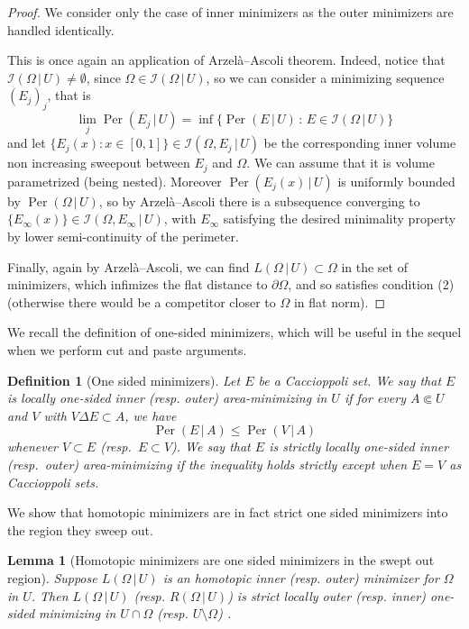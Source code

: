 \documentclass[12pt,twoside]{amsart}
\numberwithin{equation}{section}
\renewcommand{\leq}{\leqslant}
\newtheorem{lemma}[theorem]{Lemma}
\newtheorem{definition}[theorem]{Definition}
\newcommand{\cI}{\mathcal I}
\DeclareMathOperator{\Per}{Per}
\begin{document}
\begin{proof} We consider only the case of inner minimizers as the outer minimizers are handled identically. 

This is once again an application of Arzel\`a--Ascoli theorem. Indeed, notice that $\cI(\Omega\,|\, U) \not = \emptyset$, since $\Omega \in \cI(\Omega\,|\, U)$, so we can consider a minimizing sequence $(E_j)_j$, that is 
\[
	\lim_{j}\Per( E_j\,|\,U)=\inf\{ \Per(E\,|\,U)\,:\, E\in  \cI(\Omega\,|\, U)
	\}
\]
	and let $\{E_j(x): x\in [0,1]\} \in \cI(\Omega,E_j \,|\, U)$ be the corresponding inner volume non increasing sweepout between $E_j$ and $\Omega$. We can assume that it is volume parametrized (being nested). Moreover $\Per(E_j(x)\,|\,U)$ is uniformly bounded by $\Per(\Omega\,|\,U)$, so by Arzel\`a--Ascoli there is a subsequence converging to $\{E_\infty(x)\} \in \cI(\Omega, E_\infty\,|\, U)$, with $E_\infty$ satisfying the desired minimality property by lower semi-continuity of the perimeter. 
	
	Finally, again by Arzel\`a--Ascoli, we can find $L(\Omega\,|\, U)\subset \Omega$ in the set of minimizers, which infimizes the flat distance to $\partial \Omega$, and so satisfies condition (2) (otherwise there would be a competitor closer to $\Omega$ in flat norm).
\end{proof}

We recall the definition of one-sided minimizers, which will be useful in the sequel when we perform cut and paste arguments. 

\begin{definition}[One sided minimizers]
	Let $E$ be a Caccioppoli set. We say that $E$ is \emph{locally one-sided inner (resp. outer) area-minimizing} in $U$ if for every $A\Subset U$ and $V$ with $V\Delta E \subset A$, we have
\[
	\Per( E\,|\, A) \leq \Per (V \,|\, A)
\]
	whenever $V\subset E$ (resp.\ $E\subset V$). We say that $E$ is \emph{strictly locally one-sided inner (resp.\ outer) area-minimizing} if the inequality holds strictly except when $E=V$ as Caccioppoli sets. 
\end{definition}

We show that homotopic minimizers are in fact strict one sided minimizers into the region they sweep out. 

\begin{lemma}[Homotopic minimizers are one sided minimizers in the swept out region] \label{strict minimizer}
	Suppose $L(\Omega\,|\, U)$ is an homotopic inner (resp. outer) minimizer for $\Omega$ in $U$. Then $L(\Omega\,|\, U)$ (resp. $R(\Omega\,|\, U)$) is strict locally outer (resp. inner) one-sided minimizing in $U\cap \Omega$ (resp. $U\setminus \Omega$) .
\end{lemma}
\end{document}
